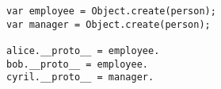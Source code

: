 \begin{verbatim}
var employee = Object.create(person);
var manager = Object.create(person);

alice.__proto__ = employee.
bob.__proto__ = employee.
cyril.__proto__ = manager.
\end{verbatim}
